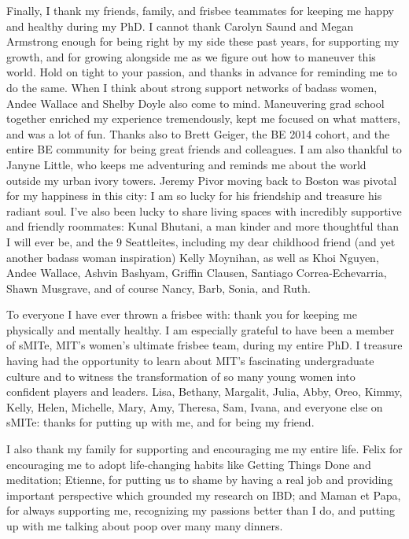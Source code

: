 \begin{singlespace}
Finally, I thank my friends, family, and frisbee teammates for keeping me happy and healthy during my PhD.
I cannot thank Carolyn Saund and Megan Armstrong enough for being right by my side these past years, for supporting my growth, and for growing alongside me as we figure out how to maneuver this world.
Hold on tight to your passion, and thanks in advance for reminding me to do the same.
When I think about strong support networks of badass women, Andee Wallace and Shelby Doyle also come to mind.
Maneuvering grad school together enriched my experience tremendously, kept me focused on what matters, and was a lot of fun.
Thanks also to Brett Geiger, the BE 2014 cohort, and the entire BE community for being great friends and colleagues.
I am also thankful to Janyne Little, who keeps me adventuring and reminds me about the world outside my urban ivory towers.
Jeremy Pivor moving back to Boston was pivotal for my happiness in this city: I am so lucky for his friendship and treasure his radiant soul.
I've also been lucky to share living spaces with incredibly supportive and friendly roommates: Kunal Bhutani, a man kinder and more thoughtful than I will ever be, and the 9 Seattleites, including my dear childhood friend (and yet another badass woman inspiration) Kelly Moynihan, as well as Khoi Nguyen, Andee Wallace, Ashvin Bashyam, Griffin Clausen, Santiago Correa-Echevarria, Shawn Musgrave, and of course Nancy, Barb, Sonia, and Ruth.

To everyone I have ever thrown a frisbee with: thank you for keeping me physically and mentally healthy. I am especially grateful to have been a member of sMITe, MIT's women's ultimate frisbee team, during my entire PhD. I treasure having had the opportunity to learn about MIT's fascinating undergraduate culture and to witness the transformation of so many young women into confident players and leaders. Lisa, Bethany, Margalit, Julia, Abby, Oreo, Kimmy, Kelly, Helen, Michelle, Mary, Amy, Theresa, Sam, Ivana, and everyone else on sMITe: thanks for putting up with me, and for being my friend.

I also thank my family for supporting and encouraging me my entire life. Felix for encouraging me to adopt life-changing habits like Getting Things Done and meditation; Etienne, for putting us to shame by having a real job and providing important perspective which grounded my research on IBD; and Maman et Papa, for always supporting me, recognizing my passions better than I do, and putting up with me talking about poop over many many dinners.

\end{singlespace}
